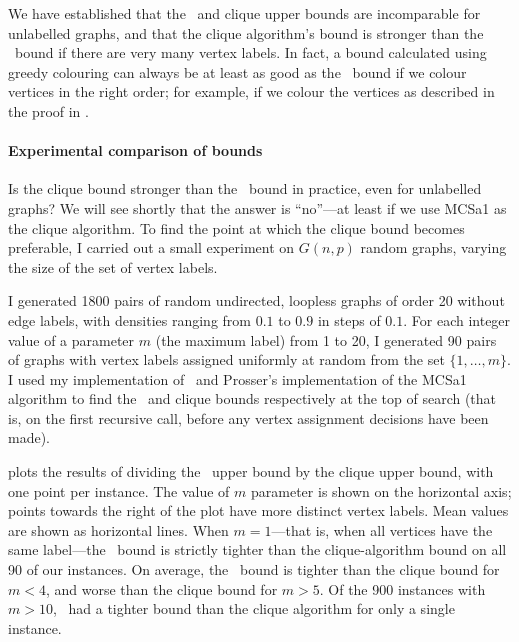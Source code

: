 We have established that the \McSplit\ and clique upper bounds are incomparable for unlabelled graphs,
and that the clique algorithm's bound is stronger than the \McSplit\ bound if there are very many vertex
labels. In fact, a bound calculated using greedy colouring can always be at least
as good as the \McSplit\ bound if we colour vertices in the right order; for example,
if we colour the vertices as described in the proof in .

\paragraph{Experimental comparison of bounds}
Is the clique bound stronger than the \McSplit\ bound in practice, even for unlabelled graphs?
We will see shortly that the answer is ``no''---at least if we use MCSa1 as the clique
algorithm.
To find the point at which the clique bound becomes preferable, I carried out a
small experiment on $G(n,p)$ random graphs, varying the size of the set of
vertex labels.

I generated 1800 pairs of random undirected, loopless graphs of order 20 without edge labels,
with densities ranging from $0.1$ to $0.9$
in steps of $0.1$.  For each integer value of a parameter $m$ (the maximum label) from 1 to 20, I generated
90 pairs of graphs with vertex labels assigned uniformly at random from the set $\{1,\dots,m\}$.  I used my
implementation of \McSplit\ and Prosser's implementation of the MCSa1 algorithm
\citep{DBLP:journals/algorithms/Prosser12} to find the \McSplit\ and clique bounds respectively
at the top of search (that is, on the first recursive call, before any vertex assignment decisions
have been made).

 plots the results of dividing the \McSplit\ upper bound by the
clique upper bound, with one point per instance.  The value of $m$ parameter is shown on the horizontal
axis; points towards the right of the plot have more distinct vertex labels.  Mean values
are shown as horizontal lines.  When $m=1$---that is,
when all vertices have the same label---the \McSplit\ bound is strictly tighter than the clique-algorithm
bound on all 90 of our instances.  On average, the \McSplit\ bound is tighter than the clique
bound for $m < 4$, and worse than the clique bound for $m > 5$.  Of the 900 instances with $m > 10$,
\McSplit\ had a tighter bound than the clique algorithm for only a single instance.

